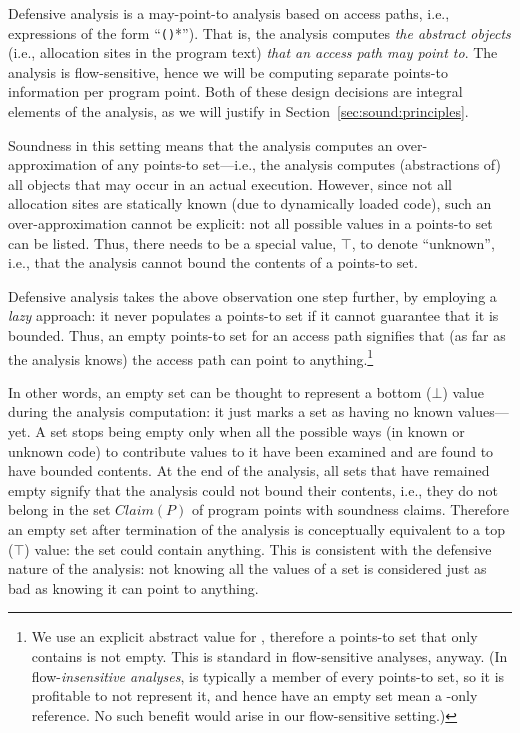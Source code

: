 Defensive analysis is a may-point-to analysis based on access paths, i.e., expressions of the form ``\texttt{()}*''). That is, the analysis computes \emph{the abstract objects} (i.e., allocation sites in the program text) \emph{that an access path may point to}. The analysis is flow-sensitive, hence we will be computing separate points-to information per program point. Both of these design decisions are integral elements of the analysis, as we will justify in Section~\ref{sec:sound:principles}.

Soundness in this setting means that the analysis computes an over-approximation of any points-to set---i.e., the analysis computes (abstractions of) all objects that may occur in an actual execution. However, since not all allocation sites are statically known (due to dynamically loaded code), such an over-approximation cannot be explicit: not all possible values in a points-to set can be listed. Thus, there needs to be a special value, $\top$, to denote ``unknown'', i.e., that the analysis cannot bound the contents of a points-to set.

Defensive analysis takes the above observation one step further, by employing a \emph{lazy} approach: it never populates a points-to set if it cannot guarantee that it is bounded. Thus, an empty points-to set for an access path signifies that (as far as the analysis knows) the access path can point to anything.\footnote{We use an explicit abstract value for , therefore a points-to set that only contains  is not empty. This is standard in flow-sensitive analyses, anyway. (In flow-\emph{insensitive analyses},  is typically a member of every points-to set, so it is profitable to not represent it, and hence have an empty set mean a -only reference. No such benefit would arise in our flow-sensitive setting.)}

In other words, an empty set can be thought to represent a bottom ($\bot$) value during the analysis computation: it just marks a set as having no known values---yet. A set stops being empty only when all the possible ways (in known or unknown code) to contribute values to it have been examined and are found to have bounded contents. At the end of the analysis, all sets that have remained empty signify that the analysis could not bound their contents, i.e., they do not belong in the set $Claim(P)$ of program points with soundness claims. Therefore an empty set after termination of the analysis is conceptually equivalent to a top ($\top$) value: the set could contain anything. This is consistent with the defensive nature of the analysis: not knowing all the values of a set is considered just as bad as knowing it can point to anything.

